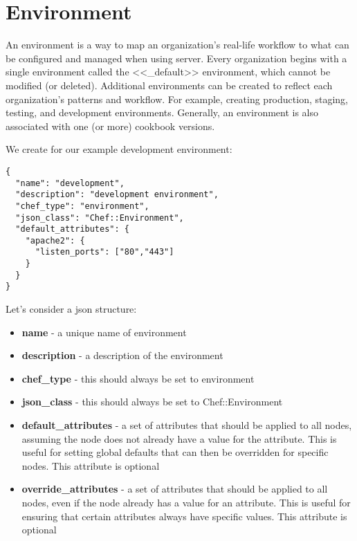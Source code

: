 \section{Environment}

An environment is a way to map an organization's real-life workflow to what can be configured and managed when using server. Every organization begins with a single environment called the <<\_default>> environment, which cannot be modified (or deleted). Additional environments can be created to reflect each organization's patterns and workflow. For example, creating production, staging, testing, and development environments. Generally, an environment is also associated with one (or more) cookbook versions.

We create for our example development environment:

\begin{lstlisting}[label=lst:my-cloud-chef-environment1,title=my-cloud/environments/development.json]
{
  "name": "development",
  "description": "development environment",
  "chef_type": "environment",
  "json_class": "Chef::Environment",
  "default_attributes": {
    "apache2": {
      "listen_ports": ["80","443"]
    }
  }
}
\end{lstlisting}

Let's consider a json structure:

\begin{itemize}
  \item \textbf{name} - a unique name of environment
  \item \textbf{description} - a description of the environment
  \item \textbf{chef\_type} - this should always be set to environment
  \item \textbf{json\_class} - this should always be set to Chef::Environment
  \item \textbf{default\_attributes} - a set of attributes that should be applied to all nodes, assuming the node does not already have a value for the attribute. This is useful for setting global defaults that can then be overridden for specific nodes. This attribute is optional
  \item \textbf{override\_attributes} - a set of attributes that should be applied to all nodes, even if the node already has a value for an attribute. This is useful for ensuring that certain attributes always have specific values. This attribute is optional
\end{itemize}

